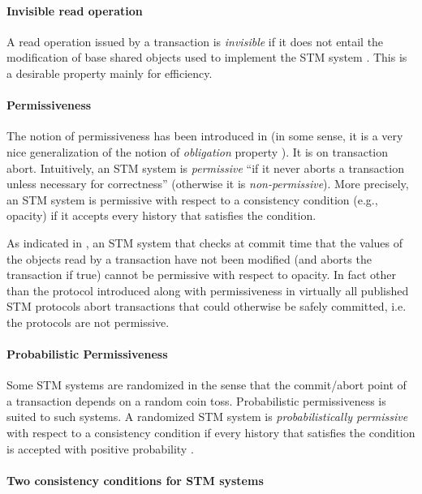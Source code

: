 \paragraph{Invisible read operation}
A read operation issued by a transaction is {\it invisible} if it does 
not entail the modification of base shared objects used to implement 
the STM system  \cite{MSHAESS06}.
This is a desirable property mainly for efficiency. 


\paragraph{Permissiveness}
The  notion  of permissiveness  has been introduced in  \cite{GHS08}
(in some sense,  it is a  very  nice generalization of the notion  of  
{\it obligation} property \cite{IR09-a}). It is on  transaction abort. 
Intuitively, an STM system is {\it permissive}  ``if it  never aborts a 
transaction unless necessary for  correctness'' (otherwise it is 
{\it non-permissive}).  More precisely, 
an STM system is permissive with respect to a consistency condition 
(e.g., opacity) if  it accepts  every history that satisfies the condition. 

As indicated in \cite{GHS08}, an STM system that checks at commit time that
the values of the objects read by a transaction have not been modified (and 
aborts the transaction if true) cannot be permissive  with respect to opacity. 
In fact other than the protocol introduced along with permissiveness in \cite{GHS08}
virtually all published STM protocols abort transactions that could
otherwise be safely committed, i.e. the protocols are not permissive.


\paragraph{Probabilistic Permissiveness}
Some STM systems are randomized in the sense that the commit/abort point of
a transaction depends on  a random coin toss. Probabilistic permissiveness is
suited to  such systems. A  randomized STM system is  {\it probabilistically
permissive} with respect to a  consistency condition if every history that
satisfies the condition is accepted with positive probability \cite{GHS08}. 



\paragraph{Two consistency conditions  for STM systems}

